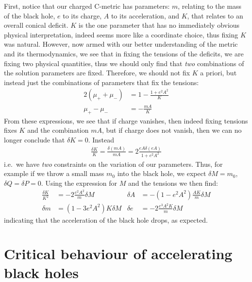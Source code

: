 \documentclass[
twoside,
openright,
frontopenright,
]{dmathesis}
\newcommand{\nn}{\nonumber}
\begin{document}
First, notice that our charged C-metric has parameters: $m$, relating to the
mass of the black hole, $e$ to its charge, $A$ to its acceleration, and $K$,
that relates to an overall conical deficit. $K$ is the one parameter that has no
immediately obvious physical interpretation, indeed seems more like a coordinate
choice, thus fixing $K$ was natural. However, now armed with our better
understanding of the metric and its thermodynamics, we see that in fixing the
tensions of the deficits, we are fixing two physical quantities, thus we should
only find that {\it two} combinations of the solution parameters are
fixed. Therefore, we should not fix $K$ a priori, but instead just the
combinations of parameters that fix the tensions:
\begin{align}
2(\mu_++\mu_-) &= 1 - \frac{1+e^2A^2}{K} \nn\\
\mu_+ - \mu_- &= - \frac{mA}{K}
\end{align}
From these expressions, we see that if charge vanishes, then indeed fixing
tensions fixes $K$ and the combination $mA$, but if charge does not vanish, then
we can no longer conclude that $\delta K=0$. Instead
\begin{align}
  \frac{\delta K}{K} = \frac{\delta (mA)}{mA} = 2\frac{eA\delta (eA)}{1+e^2A^2}
\end{align}
i.e.\ we have {\it two} constraints on the variation of our parameters.  Thus,
for example if we throw a small mass $m_0$ into the black hole, we expect
$\delta M = m_0$, $\delta Q=\delta P = 0$. Using the expression for $M$ and the
tensions we then find:
\begin{align}
\frac{\delta K}{K^2} &= - 2 \frac{e^2 A^2}{m}\delta M &
\delta A &= - (1-e^2 A^2) \frac{AK}{m} \delta M\nn\\
\delta m &= (1- 3 e^2 A^2) K \delta M&
\delta e &= -2\frac{e^3A^2K}{m} \delta M
\end{align}
indicating that the acceleration of the black hole drops, as expected.

\section{Critical behaviour of accelerating black holes}
\end{document}
